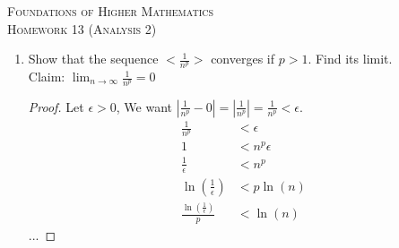 \documentclass{article}
\theoremstyle{problem}
\theoremstyle{plain}
\theoremstyle{remark}
\newcommand{\abs}[1] {
  \left| #1 \right|
}
\newcommand{\myln}[1] {
  \ln{\left( #1 \right)}
}
\begin{document}
\begin{center}
  \textsc{\Large Foundations of Higher Mathematics}\\[.3cm]
  \textsc{\Large Homework 13 (Analysis 2)}
\end{center}

\begin{enumerate}
\item Show that the sequence $<\frac{1}{n^p}>$ converges if $p > 1$. Find its limit.\\  
  Claim: $\displaystyle \lim_{n \to \infty} \frac{1}{n^p} = 0$
  \begin{proof}
    Let $\epsilon > 0$,
    We want $\abs{\frac{1}{n^p} - 0} = \abs{\frac{1}{n^p}} = \frac{1}{n^p} < \epsilon$.
    \begin{align*}
      \frac{1}{n^p} &< \epsilon\\
      1 &< n^p \epsilon\\
      \frac{1}{\epsilon} &< n^p\\
      \myln{\frac{1}{\epsilon}} &< p \myln{n}\\
      \frac{\myln{\frac{1}{\epsilon}}}{p} &< \myln{n}
    \end{align*}
    ...

  \end{proof}


\end{enumerate}
\end{document}
